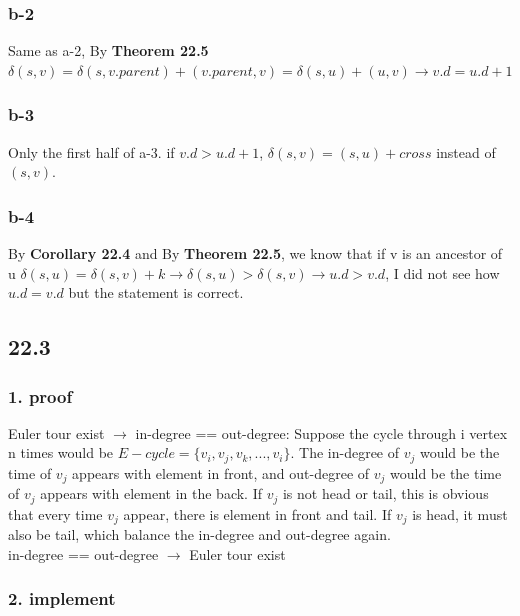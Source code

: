 \documentclass[]{article}
\begin{document}
\subsubsection{b-2}

Same as a-2, By \textbf{Theorem 22.5} $\delta(s,v) = \delta(s,v.parent) + (v.parent, v) = \delta(s,u) + (u,v) \rightarrow v.d = u.d + 1$

\subsubsection{b-3}

Only the first half of a-3. if $v.d > u.d + 1$, $\delta(s,v) = (s,u) + cross$ instead of $(s,v)$. 
\subsubsection{b-4}

By \textbf{Corollary 22.4} and By \textbf{Theorem 22.5}, we know that if v is an ancestor of u $\delta (s, u) = \delta(s, v) + k \rightarrow \delta(s, u) > \delta (s, v) \rightarrow u.d > v.d$, I did not see how $u.d = v.d$ but the statement is correct.

\subsection{22.3}

\subsubsection{1. proof}

Euler tour exist $\rightarrow$ in-degree == out-degree: Suppose the cycle through i vertex n times would be $E-cycle = \{ v_{i}, v_{j}, v_{k}, ... , v_{i} \}$. The in-degree of $v_{j}$ would be the time of  $v_{j}$ appears with element in front, and out-degree of $v_{j}$ would be the time of $v_{j}$ appears with element in the back. If $v_{j}$ is not head or tail, this is obvious that every time $v_{j}$ appear, there is element in front and tail. If $v_{j}$ is head, it must also be tail, which balance the in-degree and out-degree again.\\

in-degree == out-degree $\rightarrow$ Euler tour exist

\subsubsection{2. implement}
\end{document}
